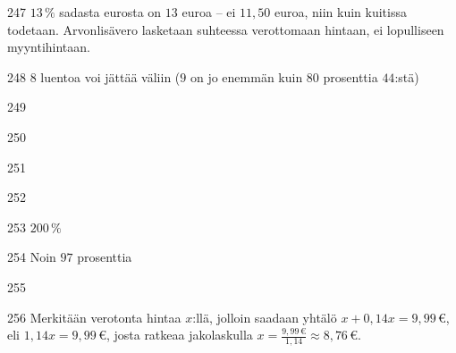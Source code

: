 \begin{Vastaus}{247}
         $13\,\%$ sadasta eurosta on $13$ euroa -- ei $11,50$ euroa, niin kuin kuitissa todetaan. Arvonlisävero lasketaan suhteessa verottomaan hintaan, ei lopulliseen myyntihintaan.
    
\end{Vastaus}
\begin{Vastaus}{248}
	$8$ luentoa voi jättää väliin ($9$ on jo enemmän kuin $80$ prosenttia $44$:stä)
	
\end{Vastaus}
\begin{Vastaus}{249}
    
\end{Vastaus}
\begin{Vastaus}{250}
	
\end{Vastaus}
\begin{Vastaus}{251}
    
\end{Vastaus}
\begin{Vastaus}{252}
    
\end{Vastaus}
\begin{Vastaus}{253}
        $200\,\%$
    
\end{Vastaus}
\begin{Vastaus}{254}
Noin $97$ prosenttia
	
\end{Vastaus}
\begin{Vastaus}{255}
	
\end{Vastaus}
\begin{Vastaus}{256}
	Merkitään verotonta hintaa $x$:llä, jolloin saadaan yhtälö $x+0,14x=9,99\,€$, eli $1,14x=9,99\,€$, josta ratkeaa jakolaskulla $x=\frac{9,99\,€}{1,14}\approx 8,76\,€$.
	
\end{Vastaus}
